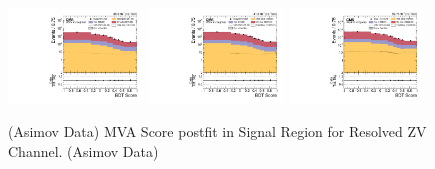 \begin{figure}[!ht]
  \centering
  \includegraphics[width=0.32\textwidth]{analysis_plots/2016_zjj.sr_l_postfit/sr_l_postfit/mva_score_zjj_var2_log.pdf}
  \includegraphics[width=0.32\textwidth]{analysis_plots/2017_zjj.sr_l_postfit/sr_l_postfit/mva_score_zjj_var2_log.pdf}
  \includegraphics[width=0.32\textwidth]{analysis_plots/2018_zjj.sr_l_postfit/sr_l_postfit/mva_score_zjj_var2_log.pdf} \\
  \caption[MVA Score postfit in Signal Region for Resolved ZV Channel]%
  {(Asimov Data) MVA Score postfit in Signal Region for Resolved ZV Channel. (Asimov Data)}%
  \label{fig:zjj-sr-l-mva-score-postfit}
\end{figure}

